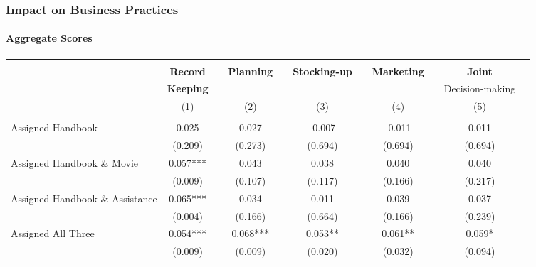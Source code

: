 \documentclass[hideothersubsections, usenames,dvipsnames,10pt]{beamer}
\begin{document}
\begin{frame}
\frametitle{Impact on Business Practices}
\framesubtitle{Aggregate Scores}
{\tiny{\begin{table}[t]
	\begin{tabular}{l*{10}{c}}
		\hline \hline
		\\
			&\textbf{Record}			&&\textbf{Planning}			&&\textbf{Stocking-up}	&&\textbf{Marketing} && \textbf{Joint} \\
&\textbf{Keeping}                       &&                        &&	                   &&	 && Decision-making \\
					&(1)					&&(2)						&&(3) 						&&(4) && (5)\\
			\cline{2-2}					\cline{4-4}					\cline{6-6}			\cline{8-8} \cline{10-10}  \\


Assigned Handbook 			&                    0.025   &&	          0.027   	 &&           -0.007   	 &&          -0.011   	  &&         0.011
      \\
         							&               (0.209)   	   &&      (0.273)   	&&         (0.694)   	     &&    (0.694)   	&&         (0.694)
    \\

         							
Assigned Handbook \& Movie 	&                     0.057*** 	 &&          0.043  	   &&       0.038  	    &&       0.040    &&        0.040        \\
          							&              (0.009)   &&	         (0.107)   	  &&       (0.117)   	  &&       (0.166)   	 &&        (0.217)         \\

         							
Assigned Handbook \& Assistance 	&              0.065*** 	  &&         0.034   	&&           0.011   	 &&           0.039 	       &&      0.037    \\
         							&           (0.004)   	  &&       (0.166)   &&	         (0.664)   && 	         (0.166)   	  &&       (0.239)    \\

         							
Assigned All Three          	&                0.054***	  &&         0.068***  	 &&          0.053**  	    &&       0.061**	   &&        0.059*          \\
									&             (0.009)    &&	         (0.009)   	&&         (0.020)   	  &&       (0.032)   &&	         (0.094)           \\


\end{tabular}
\end{table}}}
\end{frame}
\end{document}
